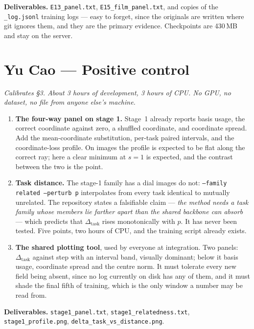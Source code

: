 \documentclass[11pt]{article}
\newcommand{\code}[1]{\texttt{\small #1}}
\newcommand{\dtask}{\Delta_{\mathrm{task}}}
\begin{document}
\noindent\textbf{Deliverables.} \code{E13\_panel.txt}, \code{E15\_film\_panel.txt}, and
copies of the \code{*\_log.jsonl} training logs --- easy to forget, since the originals
are written where git ignores them, and they are the primary evidence. Checkpoints are
430\,MB and stay on the server.

\section{Yu Cao --- Positive control}

\noindent\emph{Calibrates \S3. About 3 hours of development, 3 hours of CPU. No GPU, no
dataset, no file from anyone else's machine.}

\begin{enumerate}
  \item \textbf{The four-way panel on stage 1.} Stage~1 already reports basis usage, the
    correct coordinate against zero, a shuffled coordinate, and coordinate spread. Add the
    mean-coordinate substitution, per-task paired intervals, and the coordinate-loss
    profile. On images the profile is expected to be flat along the correct ray; here a
    clear minimum at $s=1$ is expected, and the contrast between the two is the point.
  \item \textbf{Task distance.} The stage-1 family has a dial images do not:
    \code{--family related --perturb p} interpolates from every task identical to mutually
    unrelated. The repository states a falsifiable claim --- \emph{the method needs a task
    family whose members lie farther apart than the shared backbone can absorb} --- which
    predicts that $\dtask$ rises monotonically with $p$. It has never been tested. Five
    points, two hours of CPU, and the training script already exists.
  \item \textbf{The shared plotting tool}, used by everyone at integration. Two panels:
    $\dtask$ against step with an interval band, visually dominant; below it basis usage,
    coordinate spread and the centre norm. It must tolerate every new field being absent,
    since no log currently on disk has any of them, and it must shade the final fifth of
    training, which is the only window a number may be read from.
\end{enumerate}

\noindent\textbf{Deliverables.} \code{stage1\_panel.txt}, \code{stage1\_relatedness.txt},
\code{stage1\_profile.png}, \code{delta\_task\_vs\_distance.png}.
\end{document}
